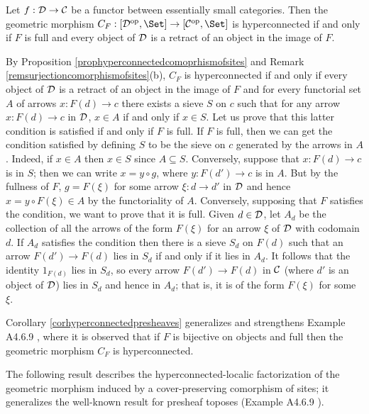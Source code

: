 \documentclass[a4paper,12pt]{article}
\begin{document}
\begin{corollary}\label{corhyperconnectedpresheaves}
	Let $f:{\cal D}\to {\cal C}$ be a functor between essentially small categories. Then the geometric morphism $C_{F}:[{\cal D}^{\textup{op}}, \Set]\to [{\cal C}^{\textup{op}}, \Set]$ is hyperconnected if and only if $F$ is full and every object of $\cal D$ is a retract of an object in the image of $F$.
\end{corollary}

\begin{proofs}
	By Proposition \ref{prophyperconnectedcomoprhismofsites} and Remark \ref{remsurjectioncomorphismofsites}(b), $C_{F}$ is hyperconnected if and only if every object of $\cal D$ is a retract of an object in the image of $F$ and for every functorial set $A$ of arrows $x:F(d)\to c$ there exists a sieve $S$ on $c$ such that for any arrow $x:F(d)\to c$ in $\cal D$, $x\in A$ if and only if $x\in S$. Let us prove that this latter condition is satisfied if and only if $F$ is full.
	If $F$ is full, then we can get the condition satisfied by defining $S$ to be the sieve on $c$ generated by the arrows in $A$. Indeed, if $x\in A$ then $x\in S$ since $A\subseteq S$. Conversely, suppose that $x:F(d)\to c$ is in $S$; then we can write $x=y\circ g$, where $y:F(d')\to c$ is in $A$. But by the fullness of $F$, $g=F(\xi)$ for some arrow $\xi:d\to d'$ in $\cal D$ and hence $x=y\circ F(\xi)\in A$ by the functoriality of $A$. Conversely, supposing that $F$ satisfies the condition, we want to prove that it is full. Given $d\in {\cal D}$, let $A_{d}$ be the collection of all the arrows of the form $F(\xi)$ for an arrow $\xi$ of $\cal D$ with codomain $d$. If $A_{d}$ satisfies the condition then there is a sieve $S_{d}$ on $F(d)$ such that an arrow $F(d')\to F(d)$ lies in $S_{d}$ if and only if it lies in $A_{d}$. It follows that the identity $1_{F(d)}$ lies in $S_{d}$, so every arrow $F(d')\to F(d)$ in $\cal C$ (where $d'$ is an object of $\cal D$) lies in $S_{d}$ and hence in $A_{d}$; that is, it is of the form $F(\xi)$ for some $\xi$. 
\end{proofs}

\begin{remark}
Corollary \ref{corhyperconnectedpresheaves} generalizes and strengthens Example A4.6.9 \cite{El}, where it is observed that if $F$ is bijective on objects and full then the geometric morphism $C_{F}$ is hyperconnected.
\end{remark}

The following result describes the hyperconnected-localic factorization of the geometric morphism induced by a cover-preserving comorphism of sites; it generalizes the well-known result for presheaf toposes (Example A4.6.9 \cite{El}).
\end{document}
